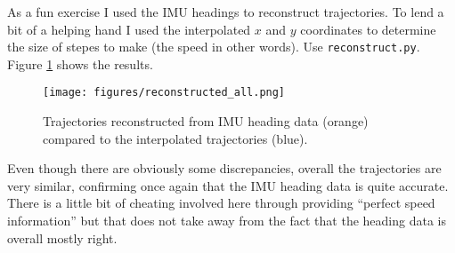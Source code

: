 \documentclass[a4]{article}
\begin{document}
As a fun exercise I used the IMU headings to reconstruct
trajectories. To lend a bit of a helping hand I used the interpolated
$x$ and $y$ coordinates to determine the size of stepes to make (the
speed in other words). Use \verb+reconstruct.py+. Figure \ref{fig:reconstruct} shows the results.

\begin{figure}
  \texttt{[image: figures/reconstructed\_all.png]}
  \caption{\label{fig:reconstruct} Trajectories reconstructed from IMU
    heading data (orange) compared to the interpolated trajectories
    (blue).}
\end{figure}

Even though there are obviously some discrepancies, overall the
trajectories are very similar, confirming once again that the IMU
heading data is quite accurate. There is a little bit of cheating
involved here through providing ``perfect speed information'' but that
does not take away from the fact that the heading data is overall mostly right.
\end{document}
